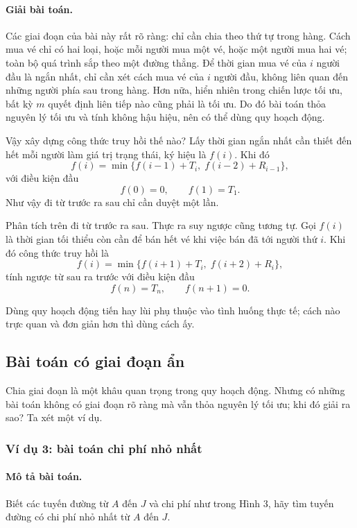 \documentclass[11pt]{article}
\begin{document}
\paragraph{Giải bài toán.}
Các giai đoạn của bài này rất rõ ràng: chỉ cần chia theo thứ tự trong hàng.
Cách mua vé chỉ có hai loại, hoặc mỗi người mua một vé, hoặc một người mua hai
vé; toàn bộ quá trình sắp theo một đường thẳng. Để thời gian mua vé của $i$
người đầu là ngắn nhất, chỉ cần xét cách mua vé của $i$ người đầu, không liên
quan đến những người phía sau trong hàng. Hơn nữa, hiển nhiên trong chiến
lược tối ưu, bất kỳ $m$ quyết định liên tiếp nào cũng phải là tối ưu. Do đó
bài toán thỏa nguyên lý tối ưu và tính không hậu hiệu, nên có thể dùng quy
hoạch động.

Vậy xây dựng công thức truy hồi thế nào? Lấy thời gian ngắn nhất cần thiết
đến hết mỗi người làm giá trị trạng thái, ký hiệu là $f(i)$. Khi đó
\[
  f(i)=\min\{f(i-1)+T_i,\;f(i-2)+R_{i-1}\},
\]
với điều kiện đầu
\[
  f(0)=0,\qquad f(1)=T_1.
\]
Như vậy đi từ trước ra sau chỉ cần duyệt một lần.

Phân tích trên đi từ trước ra sau. Thực ra suy ngược cũng tương tự. Gọi
$f(i)$ là thời gian tối thiểu còn cần để bán hết vé khi việc bán đã tới người
thứ $i$. Khi đó công thức truy hồi là
\[
  f(i)=\min\{f(i+1)+T_i,\;f(i+2)+R_i\},
\]
tính ngược từ sau ra trước với điều kiện đầu
\[
  f(n)=T_n,\qquad f(n+1)=0.
\]

Dùng quy hoạch động tiến hay lùi phụ thuộc vào tình huống thực tế; cách nào
trực quan và đơn giản hơn thì dùng cách ấy.

\subsection{Bài toán có giai đoạn ẩn}

Chia giai đoạn là một khâu quan trọng trong quy hoạch động. Nhưng có những
bài toán không có giai đoạn rõ ràng mà vẫn thỏa nguyên lý tối ưu; khi đó giải
ra sao? Ta xét một ví dụ.

\subsubsection*{Ví dụ 3: bài toán chi phí nhỏ nhất}

\paragraph{Mô tả bài toán.}
Biết các tuyến đường từ $A$ đến $J$ và chi phí như trong Hình 3, hãy tìm
tuyến đường có chi phí nhỏ nhất từ $A$ đến $J$.
\end{document}
